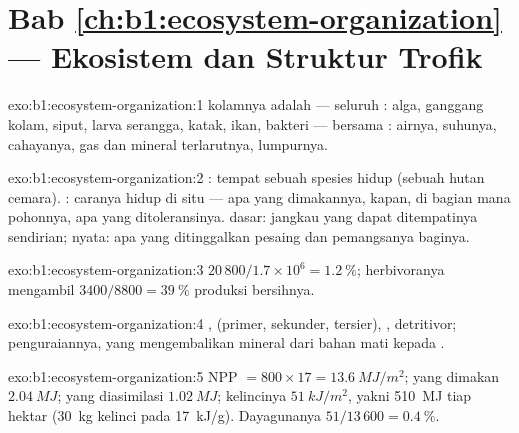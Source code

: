 \section*{Bab \ref{ch:b1:ecosystem-organization} --- Ekosistem dan Struktur Trofik}

\begin{solution}{exo:b1:ecosystem-organization:1}
 kolamnya adalah  --- seluruh : alga,
ganggang kolam, siput, larva serangga, katak, ikan, bakteri ---
bersama : airnya, suhunya, cahayanya, gas dan mineral
terlarutnya, lumpurnya.
\end{solution}

\begin{solution}{exo:b1:ecosystem-organization:2}
: tempat sebuah spesies hidup (sebuah hutan cemara). :
caranya hidup di situ --- apa yang dimakannya, kapan, di bagian mana
pohonnya, apa yang ditoleransinya.  dasar: jangkau yang dapat
ditempatinya sendirian;  nyata: apa yang ditinggalkan pesaing
dan pemangsanya baginya.
\end{solution}

\begin{solution}{exo:b1:ecosystem-organization:3}
$20\,800/1.7\times 10^6 = \qty{1.2}{\%}$; herbivoranya mengambil
$3400/8800 = \qty{39}{\%}$ produksi bersihnya.
\end{solution}

\begin{solution}{exo:b1:ecosystem-organization:4}
,  (primer, sekunder, tersier), , detritivor;
penguraiannya, yang mengembalikan mineral dari bahan mati kepada
.
\end{solution}

\begin{solution}{exo:b1:ecosystem-organization:5}
NPP $= 800\times 17 = \qty{13.6}{MJ/m^2}$; yang dimakan $\qty{2.04}{MJ}$;
yang diasimilasi $\qty{1.02}{MJ}$; kelincinya $\qty{51}{kJ/m^2}$, yakni
\qty{510}{MJ} tiap hektar (\qty{30}{kg} kelinci pada \qty{17}{kJ/g}).
Dayagunanya $51/13\,600 = \qty{0.4}{\%}$.
\end{solution}

